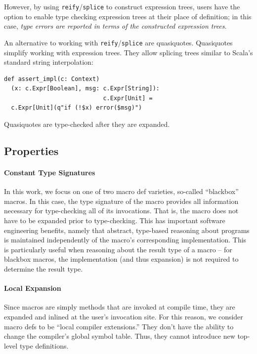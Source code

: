 \documentclass[preprint,nocopyrightspace]{sigplanconf}
\begin{document}
However, by using \verb|reify|/\verb|splice| to construct expression trees,
users have the option to enable type checking expression trees at their place
of definition; in this case, {\em type errors are reported in terms of the
constructed expression trees}.

An alternative to working with \verb|reify|/\verb|splice| are quasiquotes.
Quasiquotes simplify working with expression trees. They allow splicing trees
similar to Scala's standard string interpolation:
\begin{lstlisting}
def assert_impl(c: Context)
  (x: c.Expr[Boolean], msg: c.Expr[String]):
                            c.Expr[Unit] =
  c.Expr[Unit](q"if (!$x) error($msg)")
\end{lstlisting}
\noindent
Quasiquotes are type-checked after they are expanded.


\subsection{Properties}

\paragraph{Constant Type Signatures} In this work, we focus on one of two macro def
varieties, so-called ``blackbox'' macros. In this case, the type signature of
the macro provides all information necessary for type-checking all of its
invocations. That is, the macro does not have to be expanded prior to type-checking.
This has important software engineering benefits, namely that
abstract, type-based reasoning about programs is maintained independently of
the macro's corresponding implementation. This is particularly useful when
reasoning about the result type of a macro -- for blackbox macros, the
implementation (and thus expansion) is not required to determine the result
type.

\paragraph{Local Expansion} Since macros are simply methods that are invoked
at compile time, they are expanded and inlined at the user's invocation site.
For this reason, we consider macro defs to be ``local compiler extensions.''
They don't have the ability to change the compiler's global symbol table.
Thus, they cannot introduce new top-level type definitions.

\end{document}
